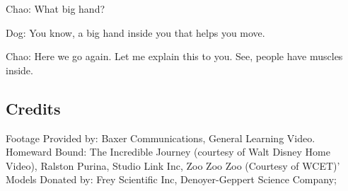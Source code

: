 Chao: What big hand?

Dog: You know, a big hand inside you that helps you move.

Chao: Here we go again. Let me explain this to you. See, people have muscles inside.

\subsection{Credits}

Footage Provided by: Baxer Communications, General Learning Video. Homeward Bound: The Incredible Journey (courtesy of Walt Disney Home Video), Ralston Purina, Studio Link Inc, Zoo Zoo Zoo (Courtesy of WCET)'
Models Donated by: Frey Scientific Inc, Denoyer-Geppert Science Company;